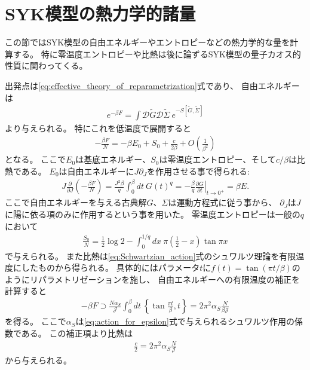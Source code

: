 \section{SYK模型の熱力学的諸量}
この節ではSYK模型の自由エネルギーやエントロピーなどの熱力学的な量を計算する。
特に零温度エントロピーや比熱は後に論ずるSYK模型の量子カオス的性質に関わってくる。

出発点は\eqref{eq:effective_theory_of_reparametrization}式であり、
自由エネルギーは
\begin{align}
	e^{-\beta F} = \int \mathcal{D}\tilde{G}\mathcal{D}\tilde{\Sigma}\ 
		e^{-S[\tilde{G}, \tilde{\Sigma}]}
\end{align}
より与えられる。
特にこれを低温度で展開すると
\begin{align}
	-\frac{\beta F}{N}
	= -\beta E_0 + S_0 + \frac{c}{2\beta} + O\left(\frac{1}{\beta^2}\right)
\end{align}
となる。
ここで$E_0$は基底エネルギー、$S_0$は零温度エントロピー、そして$c/\beta$は比熱である。
$E_0$は自由エネルギーに$J\partial_J$を作用させる事で得られる:
\begin{align}
	J\frac{\partial}{\partial J}\left(-\frac{\beta F}{N}\right)
	= \frac{J^2\beta}{q}\int_0^{\beta}dt\ G(t)^q
	= -\frac{\beta}{q}\left.\frac{\partial G}{\partial t}\right|_{t\to 0^+}
	= \beta E.
\end{align}
ここで自由エネルギーを与える古典解$G$、$\Sigma$は運動方程式に従う事から、
$\partial_J$は$J$に陽に依る項のみに作用するという事を用いた。
零温度エントロピーは一般の$q$において
\begin{align}
	\frac{S_0}{N}
	= \frac{1}{2}\log 2 - \int_0^{1/q} dx\ \pi\left(\frac{1}{2} - x\right)\tan \pi x
\end{align}
で与えられる。
また比熱は\eqref{eq:Schwartzian_action}式のシュワルツ理論を有限温度にしたものから得られる。
具体的にはパラメータ$t$に$f(t) = \tan(\pi t / \beta)$のようにリパラメトリゼーションを施し、
自由エネルギーへの有限温度の補正を計算すると
\begin{align}
	-\beta F \supset \frac{N \alpha_S}{\mathcal{J}}
		\int_0^{\beta} dt\ \left\{\tan \frac{\pi t}{\beta}, t\right\}
	= 2\pi^2\alpha_S\frac{N}{\beta \mathcal{J}}
\end{align}
を得る。
ここで$\alpha_S$は\eqref{eq:action_for_epsilon}式で与えられるシュワルツ作用の係数である。
この補正項より比熱は
\begin{align}
	\frac{c}{2} = 2\pi^2\alpha_S\frac{N}{\mathcal{J}}
	\label{eq:specific_heat}
\end{align}
から与えられる。

\pagebreak